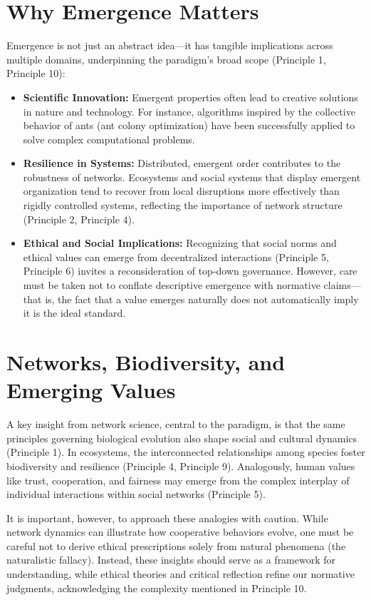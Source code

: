 \documentclass[12pt,openany]{book}
\begin{document}
\section*{Why Emergence Matters}
Emergence is not just an abstract idea---it has tangible implications across multiple domains, underpinning the paradigm's broad scope (Principle 1, Principle 10):
\begin{itemize}
    \item \textbf{Scientific Innovation:} Emergent properties often lead to creative solutions in nature and technology. For instance, algorithms inspired by the collective behavior of ants (ant colony optimization) have been successfully applied to solve complex computational problems.
    \item \textbf{Resilience in Systems:} Distributed, emergent order contributes to the robustness of networks. Ecosystems and social systems that display emergent organization tend to recover from local disruptions more effectively than rigidly controlled systems, reflecting the importance of network structure (Principle 2, Principle 4).
    \item \textbf{Ethical and Social Implications:} Recognizing that social norms and ethical values can emerge from decentralized interactions (Principle 5, Principle 6) invites a reconsideration of top-down governance. However, care must be taken not to conflate descriptive emergence with normative claims---that is, the fact that a value emerges naturally does not automatically imply it is the ideal standard.
\end{itemize} %

\section*{Networks, Biodiversity, and Emerging Values}
A key insight from network science, central to the paradigm, is that the same principles governing biological evolution also shape social and cultural dynamics (Principle 1). In ecosystems, the interconnected relationships among species foster biodiversity and resilience (Principle 4, Principle 9). Analogously, human values like trust, cooperation, and fairness may emerge from the complex interplay of individual interactions within social networks (Principle 5).

It is important, however, to approach these analogies with caution. While network dynamics can illustrate how cooperative behaviors evolve, one must be careful not to derive ethical prescriptions solely from natural phenomena (the naturalistic fallacy). Instead, these insights should serve as a framework for understanding, while ethical theories and critical reflection refine our normative judgments, acknowledging the complexity mentioned in Principle 10. %
\end{document}
